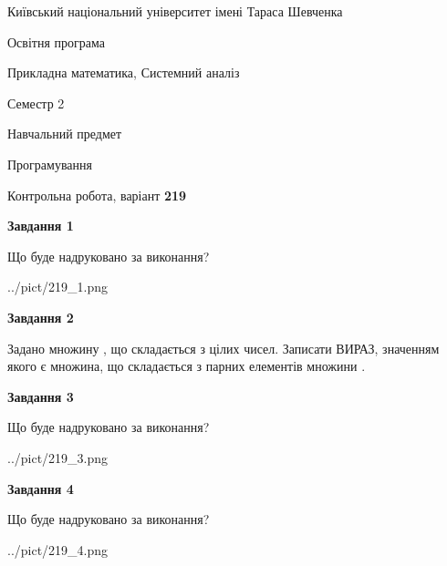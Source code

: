 \documentclass[12pt, ukrainian]{article}
\begin{document}
{{\begin {small}\par
{ \center  Київський національний університет імені Тараса Шевченка \par}
{\parbox {5 cm}{Освітня програма \hfill}{\parbox {8 cm}{Прикладна математика, Системний аналіз \hfill}}\parbox {5 cm}{\hfill Семестр 2}}\par
{\parbox {5 cm} {Навчальний предмет \hfill}\parbox {7 cm}{Програмування \hfill}\parbox {6cm}{\hfill}\par}\vspace{-7pt} \end{small}}{\center Контрольна робота, варіант  \No \textbf
{ 219 }\par}}
{
\begin {large}
{\begin {center}\textbf{Завдання 1}\end {center}}\par
Що буде надруковано за виконання?\par\par
\begin{center}
	{../pict/219_1.png}
\end{center}
\newpage

{\begin {center}\textbf{Завдання 2}\end {center}}\par
Задано множину , що складається з цілих чисел. Записати ВИРАЗ, значенням якого є множина, що складається  з парних елементів множини .\par
\newpage

{\begin {center}\textbf{Завдання 3}\end {center}}\par
Що буде надруковано за виконання?
\begin{center}
	{../pict/219_3.png}
\end{center}
\newpage

{\begin {center}\textbf{Завдання 4}\end {center}}\par
Що буде надруковано за виконання?\par
\begin{center}
	{../pict/219_4.png}
\end{center}
\newpage


\end{large}}
\end{document}
